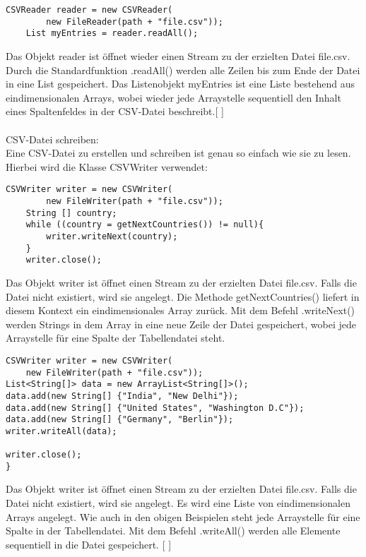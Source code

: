 \documentclass[FIPLY_base.tex]{subfiles}
\begin{document}
\begin{lstlisting}[caption={Verwendung von CSVReader: Möglichkeit 2, alles auf einmal},label=DescriptiveLabel]
	CSVReader reader = new CSVReader(
		new FileReader(path + "file.csv"));
	List myEntries = reader.readAll();
\end{lstlisting}

Das Objekt reader ist öffnet wieder einen Stream zu der erzielten Datei \grqq{}file.csv\grqq{}. Durch die Standardfunktion .readAll() werden alle Zeilen bis zum Ende der Datei in eine List gespeichert. Das Listenobjekt myEntries ist eine Liste bestehend aus eindimensionalen Arrays, wobei wieder jede Arraystelle sequentiell den Inhalt eines Spaltenfeldes in der CSV-Datei beschreibt.[ \cite{exportCSVSourceRead}] 
\ \\
\ \\
CSV-Datei schreiben:
\ \\
Eine CSV-Datei zu erstellen und schreiben ist genau so einfach wie sie zu lesen. Hierbei wird die Klasse \grqq{}CSVWriter\grqq{} verwendet:

\begin{lstlisting}[caption={Verwendung von CSVWriter: Möglichkeit 1, iterativ},label=DescriptiveLabel]
	CSVWriter writer = new CSVWriter(
		new FileWriter(path + "file.csv"));
	String [] country;
	while ((country = getNextCountries()) != null){
		writer.writeNext(country);
	}
	writer.close();
\end{lstlisting}
Das Objekt writer ist öffnet einen Stream zu der erzielten Datei \grqq{}file.csv\grqq{}. Falls die Datei nicht existiert, wird sie angelegt.
Die Methode getNextCountries() liefert in diesem Kontext ein eindimensionales Array zurück. Mit dem Befehl .writeNext() werden Strings in dem Array in eine neue Zeile der Datei gespeichert, wobei jede Arraystelle für eine Spalte der Tabellendatei steht.
\begin{lstlisting}[caption={Verwendung von CSVWriter: Möglichkeit 2, alles auf einmal},label=DescriptiveLabel]
	CSVWriter writer = new CSVWriter(
	new FileWriter(path + "file.csv"));
List<String[]> data = new ArrayList<String[]>();
data.add(new String[] {"India", "New Delhi"});
data.add(new String[] {"United States", "Washington D.C"});
data.add(new String[] {"Germany", "Berlin"});
writer.writeAll(data);

writer.close();
}
\end{lstlisting}
Das Objekt writer ist öffnet einen Stream zu der erzielten Datei \grqq{}file.csv\grqq{}. Falls die Datei nicht existiert, wird sie angelegt.
Es wird eine Liste von eindimensionalen Arrays angelegt. Wie auch in den obigen Beispielen steht jede Arraystelle für eine Spalte in der Tabellendatei. Mit dem Befehl .writeAll() werden alle Elemente sequentiell in die Datei gespeichert.
[ \cite{exportCSVSourceWrite}] 
\end{document}
